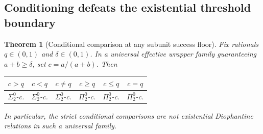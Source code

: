 \documentclass[11pt,letterpaper]{article}
\numberwithin{equation}{section}
\newtheorem{theorem}{Theorem}[section]
\theoremstyle{definition}
\theoremstyle{remark}
\newcommand{\sigtwo}{\Sigma^0_2}
\newcommand{\pitwo}{\Pi^0_2}
\begin{document}
\subsection{Conditioning defeats the existential threshold boundary}
\begin{theorem}[Conditional comparison at any subunit success floor]
\label{pqc:thm:conditionaltable}
Fix rationals $q\in(0,1)$ and $\delta\in(0,1)$. In a universal effective
wrapper family guaranteeing $a+b\ge\delta$, set $c=a/(a+b)$. Then
\begin{center}
\begin{tabular}{cccccc}
\toprule
$c>q$ & $c<q$ & $c\ne q$ & $c\ge q$ & $c\le q$ & $c=q$\\
\midrule
$\sigtwo$-c. & $\sigtwo$-c. & $\sigtwo$-c. & $\pitwo$-c. & $\pitwo$-c. & $\pitwo$-c.\\
\bottomrule
\end{tabular}
\end{center}
In particular, the strict conditional comparisons are not existential
Diophantine relations in such a universal family.
\end{theorem}
\end{document}
